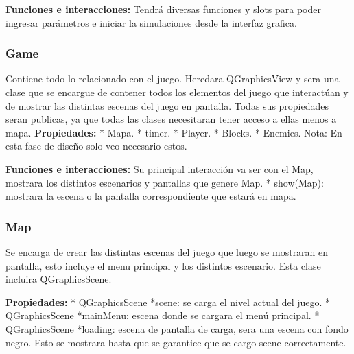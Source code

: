 \documentclass{article}
\begin{document}
\subitem \textbf{Funciones e interacciones:} \newline
Tendrá diversas funciones y slots para poder ingresar parámetros e iniciar la simulaciones desde la interfaz grafica.\newline

\subsubsection*{Game} 
Contiene todo lo relacionado con el juego. Heredara QGraphicsView y sera una clase que se encargue de contener todos los elementos del juego que interactúan y de mostrar las distintas escenas del juego en pantalla. Todas sus propiedades seran publicas, ya que todas las clases necesitaran tener acceso a ellas menos a mapa.\newline 
\subitem \textbf{Propiedades:} \newline
* Mapa.\newline
* timer. \newline
* Player.\newline
* Blocks. \newline
* Enemies. \newline
Nota: En esta fase de diseño solo veo necesario estos.\newline

\subitem \textbf{Funciones e interacciones:} \newline
Su principal interacción va ser con el Map, mostrara los distintos escenarios y pantallas que genere Map. \newline
* show(Map): mostrara la escena o la pantalla correspondiente que estará en mapa.\newline

\subsubsection*{Map}
Se encarga de crear las distintas escenas del juego que luego se mostraran en pantalla, esto incluye el menu principal y los distintos escenario. Esta clase incluira QGraphicsScene. \newline

\subitem \textbf{Propiedades:} \newline
* QGraphicsScene *scene: se carga el nivel actual del juego.\newline
* QGraphicsScene *mainMenu: escena donde se cargara el menú principal.\newline
* QGraphicsScene *loading: escena de pantalla de carga, sera una escena con fondo negro. Esto se mostrara hasta que se garantice que se cargo scene correctamente.\newline
\end{document}
